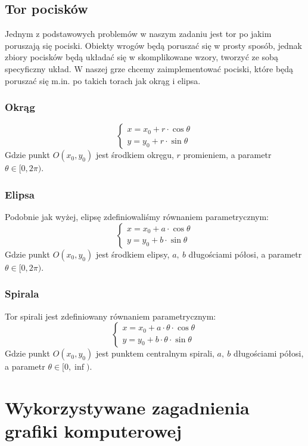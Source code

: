 \documentclass[a4paper,twoside]{article}
\begin{document}
		
		\newpage
		\subsection{Tor pocisków}
			Jednym z podstawowych problemów w naszym zadaniu jest tor po jakim poruszają się pociski. Obiekty wrogów będą poruszać się w prosty sposób, jednak zbiory pocisków będą układać się w skomplikowane wzory, tworzyć ze sobą specyficzny układ. W naszej grze chcemy zaimplementować pociski, które będą poruszać się m.in. po takich torach jak okrąg i elipsa.\\
		
		\subsubsection{Okrąg}
			$$
				\begin{cases}
					x=x_0+r\cdot \cos{\theta}\\
					y=y_0+r\cdot \sin{\theta}
				\end{cases}
			$$
			Gdzie punkt $ O(x_0, y_0) $ jest środkiem okręgu, $ r $ promieniem, a parametr $ \theta \in [0, 2\pi ) $.
		\subsubsection{Elipsa}
			Podobnie jak wyżej, elipsę zdefiniowaliśmy równaniem parametrycznym:
			$$
				\begin{cases}
					x=x_0+a\cdot \cos{\theta}\\
					y=y_0+b\cdot \sin{\theta}
				\end{cases}
			$$
			Gdzie punkt $ O(x_0, y_0) $ jest środkiem elipsy, $ a,\:b $ długościami półosi, a parametr $ \theta \in [0, 2\pi ) $.
		\subsubsection{Spirala}
			Tor spirali jest zdefiniowany równaniem parametrycznym:
			$$
				\begin{cases}
					x=x_0+a\cdot \theta \cdot \cos{\theta}\\
					y=y_0+b\cdot \theta \cdot \sin{\theta}
				\end{cases}
			$$
			Gdzie punkt $ O(x_0, y_0) $ jest punktem centralnym spirali, $ a,\:b $ długościami półosi, a parametr $ \theta \in [0, \inf ) $.
		
	\newpage
	\section{Wykorzystywane zagadnienia grafiki komputerowej}
\end{document}
